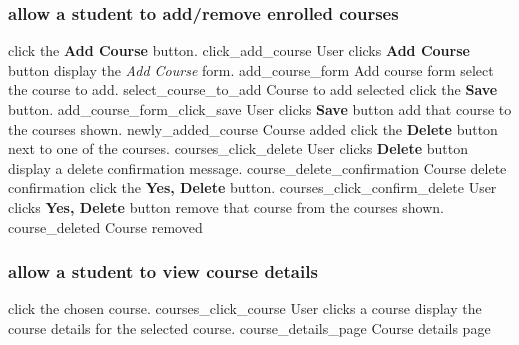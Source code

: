 \documentclass[12pt]{article}
\newenvironment{requirement}[1]
{
    \renewcommand{\thesubsubsection}{R\arabic{subsubsection}.}
    \renewcommand{\labelenumi}{
        \arabic{subsubsection}.\arabic{enumi}
    }
    \renewcommand{\labelenumii}{
        \arabic{subsubsection}.\arabic{enumi}.\arabic{enumii}
    }
    \renewcommand{\labelenumiii}{
        \arabic{subsubsection}.\arabic{enumi}.\arabic{enumii}.\arabic{enumiii}
    }
    \renewcommand{\labelenumiv}{
        \arabic{subsubsection}.\arabic{enumi}.\arabic{enumii}.\arabic{enumiii}.\arabic{enumiv}
    }
    \subsubsection{#1}
    \begin{enumerate}
}
{
    \end{enumerate}
}
\begin{document}
\begin{requirement}{\sysshall allow a student to add/remove enrolled courses}
    \navcourses
    \screenshotstep
      {\stushall click the \textbf{Add Course} button.}
      {click_add_course}
      {User clicks \textbf{Add Course} button}
    \screenshotstep
      {\sysshall display the \emph{Add Course} form.}
      {add_course_form}
      {Add course form}
    \screenshotstep
      {\stushall select the course to add.}
      {select_course_to_add}
      {Course to add selected}
    \screenshotstep
      {\stushall click the \textbf{Save} button.}
      {add_course_form_click_save}
      {User clicks \textbf{Save} button}
    \screenshotstep
      {\sysshall add that course to the courses shown.}
      {newly_added_course}
      {Course added}
    \screenshotstep
      {\stushall click the \textbf{Delete} button next to one of the courses.}
      {courses_click_delete}
      {User clicks \textbf{Delete} button}
    \screenshotstep
      {\sysshall display a delete confirmation message.}
      {course_delete_confirmation}
      {Course delete confirmation}
    \screenshotstep
      {\stushall click the \textbf{Yes, Delete} button.}
      {courses_click_confirm_delete}
      {User clicks \textbf{Yes, Delete} button}
    \screenshotstep
      {\sysshall remove that course from the courses shown.}
      {course_deleted}
      {Course removed}
\end{requirement}

\newcommand{\navcoursedetails}{
    \navcourses
    \screenshotstep
      {\stushall click the chosen course.}
      {courses_click_course}
      {User clicks a course}
    \screenshotstep
      {\sysshall display the course details for the selected course.}
      {course_details_page}
      {Course details page}
}

\begin{requirement}{\sysshall allow a student to view course details}
    \navcoursedetails
\end{requirement}
\end{document}
